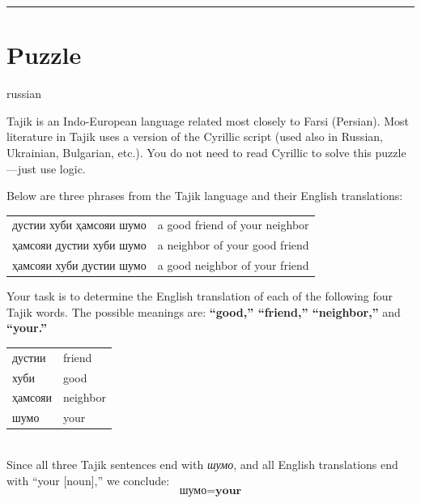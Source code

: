\documentclass{article}
\begin{document}
\noindent\rule{16.5cm}{0.4pt}

\section{Puzzle}

\begin{otherlanguage*}{russian}

\begin{puzzle}\label{example:naclo-tajik}
    Tajik is an Indo-European language related most closely to Farsi (Persian). Most literature in Tajik uses a version of the Cyrillic script (used also in Russian, Ukrainian, Bulgarian, etc.). You do not need to read Cyrillic to solve this puzzle—just use logic.

    Below are three phrases from the Tajik language and their English translations:

    \begin{center}
        \begin{tabular}{ll}
            дустии хуби ҳамсояи шумо & a good friend of your neighbor \\
            ҳамсояи дустии хуби шумо & a neighbor of your good friend \\
            ҳамсояи хуби дустии шумо & a good neighbor of your friend \\
        \end{tabular}
    \end{center}

    Your task is to determine the English translation of each of the following four Tajik words. The possible meanings are: \textbf{``good,'' ``friend,'' ``neighbor,''} and \textbf{``your.''}

    \begin{center}
        \begin{tabular}{ll}
            дустии   & friend \\
            хуби     & good \\
            ҳамсояи  & neighbor \\
            шумо     & your \\
        \end{tabular}
    \end{center}
     
\end{puzzle}

\begin{soln}\ \\\indent
    Since all three Tajik sentences end with \textit{шумо}, and all English translations end with “your [noun],” we conclude:
    \[
        \text{шумо} = \textbf{your}
    \]
    

\end{soln}
\end{otherlanguage*}
\end{document}
